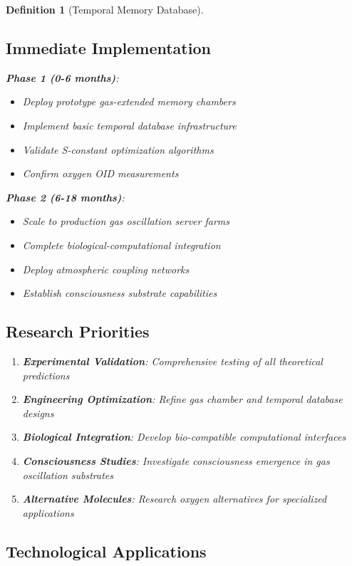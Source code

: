 \documentclass[12pt]{article}
\newtheorem{definition}[theorem]{Definition}
\begin{document}
\begin{definition}[Temporal Memory Database]
\subsection{Immediate Implementation}

\textbf{Phase 1 (0-6 months)}:
\begin{itemize}
\item Deploy prototype gas-extended memory chambers
\item Implement basic temporal database infrastructure
\item Validate S-constant optimization algorithms
\item Confirm oxygen OID measurements
\end{itemize}

\textbf{Phase 2 (6-18 months)}:
\begin{itemize}
\item Scale to production gas oscillation server farms
\item Complete biological-computational integration
\item Deploy atmospheric coupling networks
\item Establish consciousness substrate capabilities
\end{itemize}

\subsection{Research Priorities}

\begin{enumerate}
\item \textbf{Experimental Validation}: Comprehensive testing of all theoretical predictions
\item \textbf{Engineering Optimization}: Refine gas chamber and temporal database designs
\item \textbf{Biological Integration}: Develop bio-compatible computational interfaces
\item \textbf{Consciousness Studies}: Investigate consciousness emergence in gas oscillation substrates
\item \textbf{Alternative Molecules}: Research oxygen alternatives for specialized applications
\end{enumerate}

\subsection{Technological Applications}


\end{definition}
\end{document}
